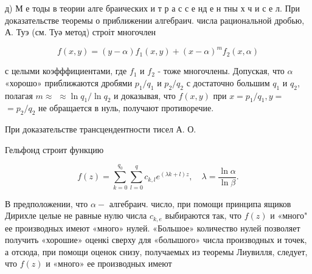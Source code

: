 \documentclass[10pt]{article}
\begin{document}
д) М е тоды в теории алге браических и т р а с с е нд е н тны х ч и с е л. При доказательстве теоремы о приближении алгебраич. числа рациональной дробью, А. Туэ (см. Туә метод) строіт многочлен



\[

f(x, y)=(y-\alpha) f_{1}(x, y)+(x-\alpha)^{m} f_{2}(x, \alpha)

\]



с целыми коэфффициентами, где $f_{1}$ и $f_{2}$ - тоже многочлены. Допуская, что $\alpha$ «хорошо» приближаются дробями $p_{1} / q_{1}$ и $p_{2} / q_{2}$ с достаточно большим $q_{1}$ и $q_{2}$, полагая $m \approx$ $\approx \ln q_{1} / \ln q_{2}$ и доказывая, что $f(x, y)$ при $x=p_{1} / q_{1}, y=$ $=p_{2} / q_{2}$ не обращается в нуль, получают противоречие.



При доказательстве трансцендентности тисел А. О.



Гельфонд строит функцию



\[

f(z)=\sum_{k=0}^{q_{0}} \sum_{l=0}^{q} c_{k, l} e^{(\lambda k+l) z}, \quad \lambda=\frac{\ln \alpha}{\ln \beta} .

\]



В предположении, что $\alpha-$ алгебраич. число, при помощи принципа ящиков Дирихле целые не равные нулю числа $c_{k, e}$ выбираются так, что $f(z)$ и «много" ее производных имеют «много» нулей. «Большое» количество нулей позволяет получить «хорошие» оценкі сверху для «болышого» числа производных и точек, а отсюда, при помощи оценок снизу, получаемых из теоремы Лиувилля, следует, что $f(z)$ и «много» ее производных имеют
\end{document}
